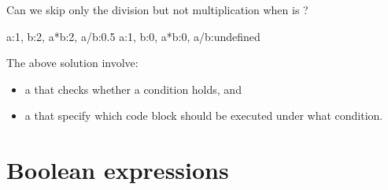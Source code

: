 \documentclass[letterpaper,10pt,english]{sphinxmanual}
\begin{document}
Can we skip only the division but not multiplication when  is ?

\begin{sphinxVerbatim}[commandchars=\\\{\}]
  
            
         


 
   
\end{sphinxVerbatim}

\begin{sphinxVerbatim}[commandchars=\\\{\}]
a:1, b:2, a*b:2, a/b:0.5
a:1, b:0, a*b:0, a/b:undefined
\end{sphinxVerbatim}

The above solution involve:
\begin{itemize}
\item {} 
a   that checks whether a condition holds, and

\item {} 
a   that specify which code block should be executed under what condition.

\end{itemize}


\section{Boolean expressions}
\label{\detokenize{Lecture3/Conditional Execution:boolean-expressions}}
\end{document}

